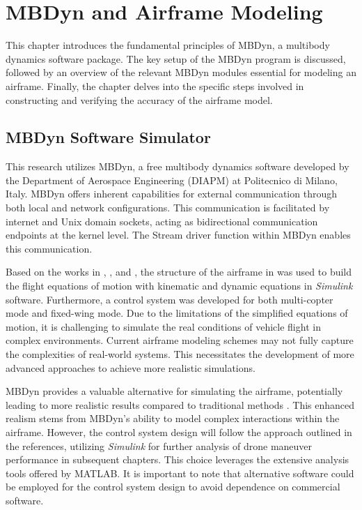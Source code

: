 \chapter{MBDyn and Airframe Modeling}
\label{ch:chapter1}

This chapter introduces the fundamental principles of MBDyn, a multibody dynamics software package. The key setup of the MBDyn program is discussed, followed by an overview of the relevant MBDyn modules essential for modeling an airframe. Finally, the chapter delves into the specific steps involved in constructing and verifying the accuracy of the airframe model.

\section{MBDyn Software Simulator}
This research utilizes MBDyn, a free multibody dynamics software developed by the Department of Aerospace Engineering (DIAPM) at Politecnico di Milano, Italy. MBDyn offers inherent capabilities for external communication through both local and network configurations. This communication is facilitated by internet and Unix domain sockets, acting as bidirectional communication endpoints at the kernel level. The Stream driver function within MBDyn enables this communication.

Based on the works in \cite{battaini2020}, \cite{martello2021}, and \cite{battaini2022}, the structure of the airframe in \cite{martello2021} was used to build the flight equations of motion with kinematic and dynamic equations in \textit{Simulink} software. Furthermore, a control system was developed for both multi-copter mode and fixed-wing mode. Due to the limitations of the simplified equations of motion, it is challenging to simulate the real conditions of vehicle flight in complex environments. Current airframe modeling schemes may not fully capture the complexities of real-world systems. This necessitates the development of more advanced approaches to achieve more realistic simulations.

MBDyn provides a valuable alternative for simulating the airframe, potentially leading to more realistic results compared to traditional methods \cite{Migliore2019}. This enhanced realism stems from MBDyn's ability to model complex interactions within the airframe. However, the control system design will follow the approach outlined in the references, utilizing \textit{Simulink} for further analysis of drone maneuver performance in subsequent chapters. This choice leverages the extensive analysis tools offered by MATLAB. It is important to note that alternative software could be employed for the control system design to avoid dependence on commercial software.

